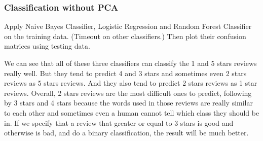 \documentclass[12pt]{article}
\begin{document}
\subsubsection{Classification without PCA}
Apply Naive Bayes Classifier, Logistic Regression and Random Forest Classifier on the training data. (Timeout on other classifiers.) Then plot their confusion matrices using testing data.
\begin{figure}[H]
\captionsetup[subfigure]{labelformat=empty}
\centering
{}
\end{figure}
We can see that all of these three classifiers can classify the 1 and 5 stars reviews really well. But they tend to predict 4 and 3 stars and sometimes even 2 stars reviews as 5 stars reviews. And they also tend to predict 2 stars reviews as 1 star reviews. Overall, 2 stars reviews are the most difficult ones to predict, following by 3 stars and 4 stars because the words used in those reviews are really similar to each other and sometimes even a human cannot tell which class they should be in. If we specify that a review that greater or equal to 3 stars is good and otherwise is bad, and do a binary classification, the result will be much better.
\end{document}

